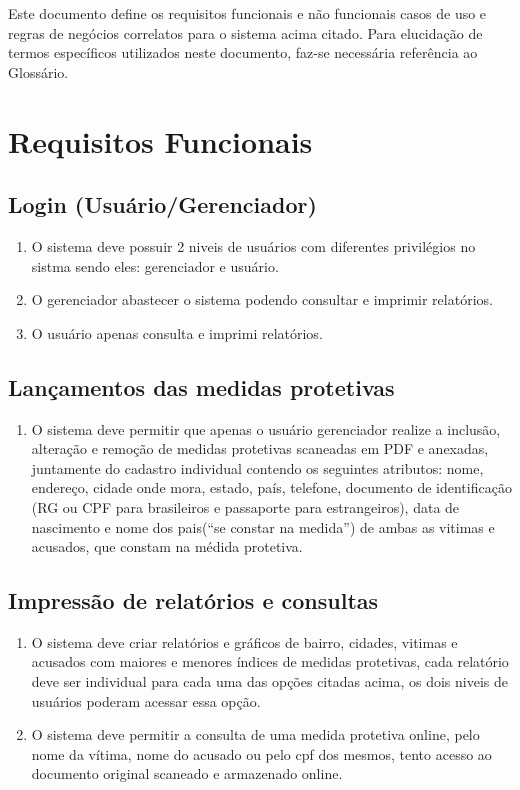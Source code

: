 \documentclass[
	12pt,				%
    oneside,			%
	a4paper,			%
	chapter=TITLE,		%
	english,			%
	french,				%
	spanish,			%
	brazil,				%
	]{abntex2}
\begin{document}
		Este documento define os requisitos funcionais e não funcionais casos de uso e regras de negócios correlatos para o sistema acima citado. Para elucidação de termos específicos utilizados neste documento, faz-se necessária referência ao Glossário.

	\section {Requisitos Funcionais}\label{RF}
	
		\subsection{Login (Usuário/Gerenciador)}
			\begin{enumerate}
				\item O sistema deve possuir 2 niveis de usuários com diferentes privilégios no sistma sendo eles: gerenciador e usuário. 
				 \item O gerenciador abastecer o sistema podendo consultar e imprimir relatórios.
				 \item O usuário apenas consulta e imprimi relatórios.
			
			\end{enumerate}
		 
		\subsection{Lançamentos das medidas protetivas} \label{RFN1}
	    	\begin{enumerate} 
				\item O sistema deve permitir que apenas o usuário gerenciador realize a inclusão, alteração e remoção de medidas protetivas scaneadas em PDF e anexadas, juntamente do cadastro individual contendo os seguintes atributos: nome, endereço, cidade onde mora, estado, país, telefone, documento de identificação (RG ou CPF para brasileiros e passaporte para estrangeiros), data de nascimento e nome dos pais(“se constar na medida”) de ambas as vitimas e acusados, que constam na médida protetiva.\label{teste}
			
		   	\end{enumerate}
   	
		\subsection{Impressão de relatórios e consultas}
			\begin{enumerate}
				\item O sistema deve criar relatórios e gráficos de bairro, cidades, vitimas e acusados com maiores e menores índices de medidas protetivas, cada relatório deve ser individual para cada uma das opções citadas acima, os dois niveis de usuários poderam acessar essa opção.
				\item O sistema deve permitir a consulta de uma medida protetiva online, pelo nome da vítima, nome do acusado ou pelo cpf dos mesmos, tento acesso ao documento original scaneado e armazenado online.
			\end{enumerate}
	
\end{document}
